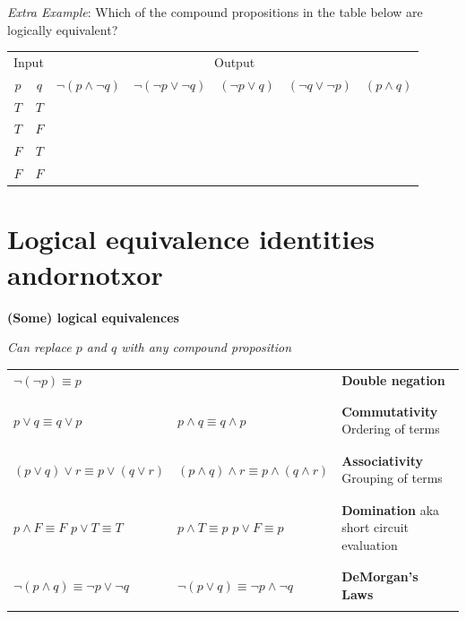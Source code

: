 \documentclass[12pt, oneside]{article}
\begin{document}
{\it Extra Example}: Which of the  compound propositions in the table below are logically equivalent?
\begin{center}
\begin{tabular}{cc||c|c|c|c|c}
\multicolumn{2}{c||}{Input}  & \multicolumn{5}{c}{Output} \\
$p$ & $q$ & $\lnot (p \land \lnot q)$ & $\lnot (\lnot p  \lor \lnot q)$ &  $(\lnot p \lor  q)$
& $(\lnot q \lor \lnot p)$ & $(p \land q)$  \\
\hline
$T$ & $T$ & &&&&\\
$T$ & $F$ & &&&&\\
$F$ & $T$ & &&&&\\
$F$ & $F$ & &&&&\\
\end{tabular}
\end{center} \vfill
\section*{Logical equivalence identities andornotxor}


{\bf (Some) logical equivalences}

{\it Can replace $p$ and $q$ with any compound proposition}

\begin{tabular}{llp{3in}}
$\lnot ( \lnot p) \equiv p$ & & {\bf Double negation}\\
&& \\
&& \\
$p \lor q \equiv q \lor p$ & $p \land q \equiv q \land p$ & {\bf Commutativity} Ordering of terms\\
&& \\
&& \\
$(p \lor q) \lor r  \equiv p \lor (q \lor r)$ & $(p \land q) \land r  \equiv p \land (q \land r)$ & {\bf Associativity} Grouping of terms\\
&& \\
&& \\
$p \land F \equiv F$ \qquad $p \lor T \equiv T$ & $p \land T \equiv p$ \qquad $p \lor F \equiv p$ & {\bf Domination} aka 
short circuit evaluation\\
&& \\
&& \\
$\lnot (p \land q) \equiv \lnot p \lor \lnot q$ & $\lnot (p \lor q) \equiv \lnot p \land\lnot q$  & {\bf DeMorgan's Laws}\\
&& \\
\end{tabular}
 \vfill
\end{document}
